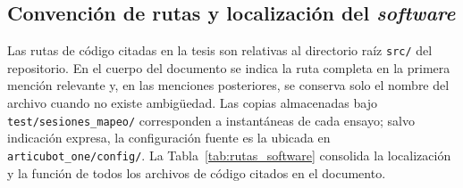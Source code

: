 \begin{appendices}
\section{Convención de rutas y localización del \texorpdfstring{\textit{software}}{software}}
\label{anx:rutas_software}

Las rutas de código citadas en la tesis son relativas al directorio raíz
\texttt{src/} del repositorio. En el cuerpo del documento se indica la ruta
completa en la primera mención relevante y, en las menciones posteriores, se
conserva solo el nombre del archivo cuando no existe ambigüedad. Las copias
almacenadas bajo \texttt{test/\allowbreak{}sesiones\_\allowbreak{}mapeo/} corresponden a instantáneas de
cada ensayo; salvo indicación expresa, la configuración fuente es la ubicada
en \texttt{articubot\_\allowbreak{}one/\allowbreak{}config/}. La Tabla~\ref{tab:rutas_software} consolida la localización y la función de
todos los archivos de código citados en el documento.


\end{appendices}
